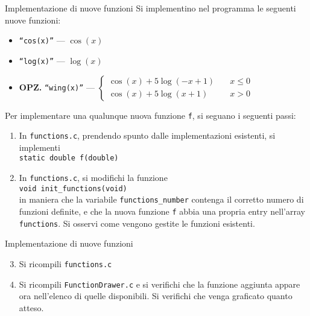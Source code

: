 \documentclass{beamer}
\begin{document}
\begin{frame}[fragile]{Implementazione di nuove funzioni}
Si implementino nel programma le seguenti nuove funzioni:
\begin{itemize}
 \item \texttt{``cos(x)''} --- $\cos(x)$
 \item \texttt{``log(x)''} --- $\log(x)$
 \item \textbf{OPZ.} \texttt{``wing(x)''} --- $\left\{
        \begin{array}{ll}
            \cos(x) + 5 \log(-x + 1) & \quad x \leq 0 \\
            \cos(x) + 5 \log(x + 1) & \quad x > 0
        \end{array}
    \right.$
\end{itemize}
Per implementare una qualunque nuova funzione \texttt{f}, si seguano i seguenti passi:
\begin{enumerate}
 \item In \texttt{functions.c}, prendendo spunto dalle implementazioni esistenti, si implementi \\ \texttt{static double f(double)}
 \item In \texttt{functions.c}, si modifichi la funzione \\ \texttt{void init\_functions(void)} \\ in maniera che la variabile \texttt{functions\_number} contenga il corretto numero di funzioni definite, e che la nuova funzione \texttt{f} abbia una propria entry nell'array \texttt{functions}. Si osservi come vengono gestite le funzioni esistenti.
\end{enumerate}
\end{frame}

\begin{frame}[fragile]{Implementazione di nuove funzioni}
\begin{enumerate}
\setcounter{enumi}{2}
 \item Si ricompili \texttt{functions.c}
 \item Si ricompili \texttt{FunctionDrawer.c} e si verifichi che la funzione aggiunta appare ora nell'elenco di quelle disponibili. Si verifichi che venga graficato quanto atteso.
\end{enumerate}
\end{frame}
\end{document}
